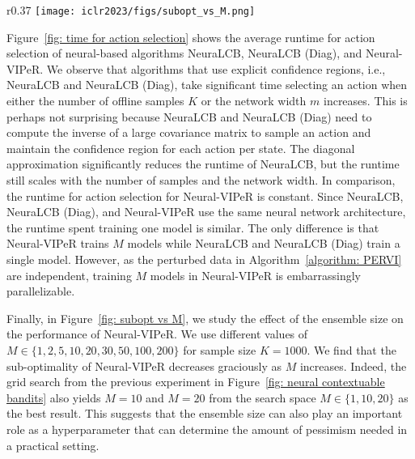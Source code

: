 \documentclass{article} \usepackage{iclr2023/iclr2023_conference,times}
\begin{document}
\begin{wrapfigure}{r}{0.37\textwidth}
\vspace{-10pt}
    \centering
    \texttt{[image: iclr2023/figs/subopt\_vs\_M.png]}
\caption{Sub-optimality of Neural-VIPeR versus different values of $M$.}
    \label{fig: subopt vs M}
    \vspace{-5pt}
\end{wrapfigure}

Figure~\ref{fig: time for action selection} shows the average runtime for action selection of neural-based algorithms NeuraLCB, NeuraLCB (Diag), and Neural-VIPeR. We observe that algorithms that use explicit confidence regions, i.e., NeuraLCB and NeuraLCB (Diag), take significant time selecting an action when either the number of offline samples $K$ or the network width $m$ increases. This is perhaps not surprising because NeuraLCB and NeuraLCB (Diag) need to compute the inverse of a large covariance matrix to sample an action and maintain the confidence region for each action per state. The diagonal approximation significantly reduces the runtime of NeuraLCB, but the runtime still scales with the number of samples and the network width. In comparison, the runtime for action selection for Neural-VIPeR is constant. Since NeuraLCB, NeuraLCB (Diag), and Neural-VIPeR use the same neural network architecture, the runtime spent training one model is similar. The only difference is that Neural-VIPeR trains $M$ models while NeuraLCB and NeuraLCB (Diag) train a single model. However, as the perturbed data in Algorithm~\ref{algorithm: PERVI} are independent, training $M$ models in Neural-VIPeR is embarrassingly parallelizable. 

















Finally, in Figure~\ref{fig: subopt vs M}, we study the effect of the ensemble size on the performance of Neural-VIPeR. We use  different values of $M \in \{1,2,5,10,20,30,50,100,200\}$ for sample size $K = 1000$. We find that the sub-optimality of Neural-VIPeR decreases graciously as $M$ increases. Indeed, the grid search from the previous experiment in Figure~\ref{fig: neural contextuable bandits} also yields $M = 10$ and $M = 20$ from the search space $M \in \{1, 10, 20\}$ as the best result. This suggests that the ensemble size can also play an important role as a hyperparameter that can determine the amount of pessimism needed in a practical setting.
\end{document}
